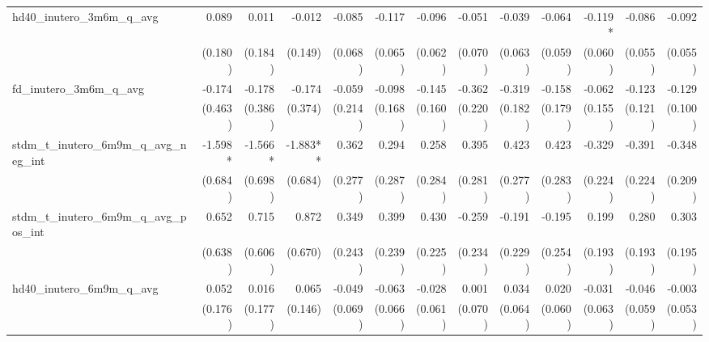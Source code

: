 \begin{tabular}{lrrrrrrrrrrrr}
hd40\_inutero\_3m6m\_q\_avg                 &        0.089 &        0.011 &       -0.012 &       -0.085 &       -0.117 &       -0.096 &       -0.051 &       -0.039 &       -0.064 &      -0.119* &       -0.086 &       -0.092 \\ 
                                            &      (0.180) &      (0.184) &      (0.149) &      (0.068) &      (0.065) &      (0.062) &      (0.070) &      (0.063) &      (0.059) &      (0.060) &      (0.055) &      (0.055) \\ 
fd\_inutero\_3m6m\_q\_avg                   &       -0.174 &       -0.178 &       -0.174 &       -0.059 &       -0.098 &       -0.145 &       -0.362 &       -0.319 &       -0.158 &       -0.062 &       -0.123 &       -0.129 \\ 
                                            &      (0.463) &      (0.386) &      (0.374) &      (0.214) &      (0.168) &      (0.160) &      (0.220) &      (0.182) &      (0.179) &      (0.155) &      (0.121) &      (0.100) \\ 
stdm\_t\_inutero\_6m9m\_q\_avg\_neg\_int    &      -1.598* &      -1.566* &     -1.883** &        0.362 &        0.294 &        0.258 &        0.395 &        0.423 &        0.423 &       -0.329 &       -0.391 &       -0.348 \\ 
                                            &      (0.684) &      (0.698) &      (0.684) &      (0.277) &      (0.287) &      (0.284) &      (0.281) &      (0.277) &      (0.283) &      (0.224) &      (0.224) &      (0.209) \\ 
stdm\_t\_inutero\_6m9m\_q\_avg\_pos\_int    &        0.652 &        0.715 &        0.872 &        0.349 &        0.399 &        0.430 &       -0.259 &       -0.191 &       -0.195 &        0.199 &        0.280 &        0.303 \\ 
                                            &      (0.638) &      (0.606) &      (0.670) &      (0.243) &      (0.239) &      (0.225) &      (0.234) &      (0.229) &      (0.254) &      (0.193) &      (0.193) &      (0.195) \\ 
hd40\_inutero\_6m9m\_q\_avg                 &        0.052 &        0.016 &        0.065 &       -0.049 &       -0.063 &       -0.028 &        0.001 &        0.034 &        0.020 &       -0.031 &       -0.046 &       -0.003 \\ 
                                            &      (0.176) &      (0.177) &      (0.146) &      (0.069) &      (0.066) &      (0.061) &      (0.070) &      (0.064) &      (0.060) &      (0.063) &      (0.059) &      (0.053) \\ 

\end{tabular}
